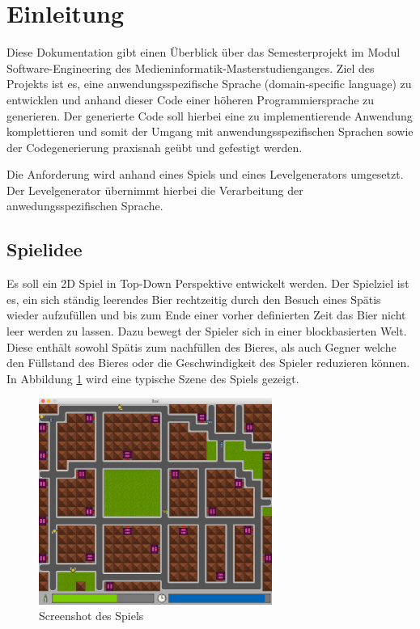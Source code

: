 \section{Einleitung}

Diese Dokumentation gibt einen Überblick über das Semesterprojekt im Modul Software-Engineering des Medieninformatik-Masterstudienganges.
Ziel des Projekts ist es, eine anwendungsspezifische Sprache (domain-specific language) zu entwicklen und anhand dieser Code einer höheren Programmiersprache zu generieren.
Der generierte Code soll hierbei eine zu implementierende Anwendung komplettieren und somit der Umgang mit anwendungsspezifischen Sprachen sowie der Codegenerierung praxisnah geübt und gefestigt werden.

Die Anforderung wird anhand eines Spiels und eines Levelgenerators umgesetzt.
Der Levelgenerator übernimmt hierbei die Verarbeitung der anwedungsspezifischen Sprache.

\subsection{Spielidee}

Es soll ein 2D Spiel in Top-Down Perspektive entwickelt werden.
Der Spielziel ist es, ein sich ständig leerendes Bier rechtzeitig durch den Besuch eines Spätis wieder aufzufüllen und bis zum Ende einer vorher definierten Zeit das Bier nicht leer werden zu lassen.
Dazu bewegt der Spieler sich in einer blockbasierten Welt.
Diese enthält sowohl Spätis zum nachfüllen des Bieres, als auch Gegner welche den Füllstand des Bieres oder die Geschwindigkeit des Spieler reduzieren können.
In Abbildung \ref{fig:einleitung:screenshot} wird eine typische Szene des Spiels gezeigt.

\begin{figure}[]
\centering
\includegraphics[width=3in]{img/02_screenshot.png}
\caption{Screenshot des Spiels}
\label{fig:einleitung:screenshot}
\end{figure}


